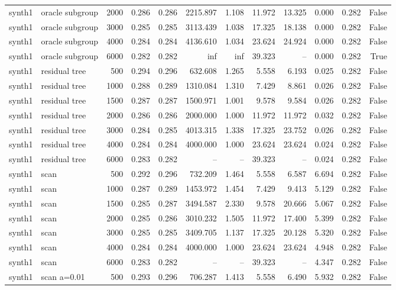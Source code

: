 \begin{tabular}{llrrrrrrrrrr}
synth1 & oracle subgroup & 2000 & 0.286 & 0.286 & 2215.897 & 1.108 & 11.972 & 13.325 & 0.000 & 0.282 & False \\
synth1 & oracle subgroup & 3000 & 0.285 & 0.285 & 3113.439 & 1.038 & 17.325 & 18.138 & 0.000 & 0.282 & False \\
synth1 & oracle subgroup & 4000 & 0.284 & 0.284 & 4136.610 & 1.034 & 23.624 & 24.924 & 0.000 & 0.282 & False \\
synth1 & oracle subgroup & 6000 & 0.282 & 0.282 & inf & inf & 39.323 & -- & 0.000 & 0.282 & True \\
synth1 & residual tree & 500 & 0.294 & 0.296 & 632.608 & 1.265 & 5.558 & 6.193 & 0.025 & 0.282 & False \\
synth1 & residual tree & 1000 & 0.288 & 0.289 & 1310.084 & 1.310 & 7.429 & 8.861 & 0.026 & 0.282 & False \\
synth1 & residual tree & 1500 & 0.287 & 0.287 & 1500.971 & 1.001 & 9.578 & 9.584 & 0.026 & 0.282 & False \\
synth1 & residual tree & 2000 & 0.286 & 0.286 & 2000.000 & 1.000 & 11.972 & 11.972 & 0.032 & 0.282 & False \\
synth1 & residual tree & 3000 & 0.284 & 0.285 & 4013.315 & 1.338 & 17.325 & 23.752 & 0.026 & 0.282 & False \\
synth1 & residual tree & 4000 & 0.284 & 0.284 & 4000.000 & 1.000 & 23.624 & 23.624 & 0.024 & 0.282 & False \\
synth1 & residual tree & 6000 & 0.283 & 0.282 & -- & -- & 39.323 & -- & 0.024 & 0.282 & False \\
synth1 & scan & 500 & 0.292 & 0.296 & 732.209 & 1.464 & 5.558 & 6.587 & 6.694 & 0.282 & False \\
synth1 & scan & 1000 & 0.287 & 0.289 & 1453.972 & 1.454 & 7.429 & 9.413 & 5.129 & 0.282 & False \\
synth1 & scan & 1500 & 0.285 & 0.287 & 3494.587 & 2.330 & 9.578 & 20.666 & 5.067 & 0.282 & False \\
synth1 & scan & 2000 & 0.285 & 0.286 & 3010.232 & 1.505 & 11.972 & 17.400 & 5.399 & 0.282 & False \\
synth1 & scan & 3000 & 0.285 & 0.285 & 3409.705 & 1.137 & 17.325 & 20.128 & 5.320 & 0.282 & False \\
synth1 & scan & 4000 & 0.284 & 0.284 & 4000.000 & 1.000 & 23.624 & 23.624 & 4.948 & 0.282 & False \\
synth1 & scan & 6000 & 0.283 & 0.282 & -- & -- & 39.323 & -- & 4.347 & 0.282 & False \\
synth1 & scan a=0.01 & 500 & 0.293 & 0.296 & 706.287 & 1.413 & 5.558 & 6.490 & 5.932 & 0.282 & False \\

\end{tabular}
